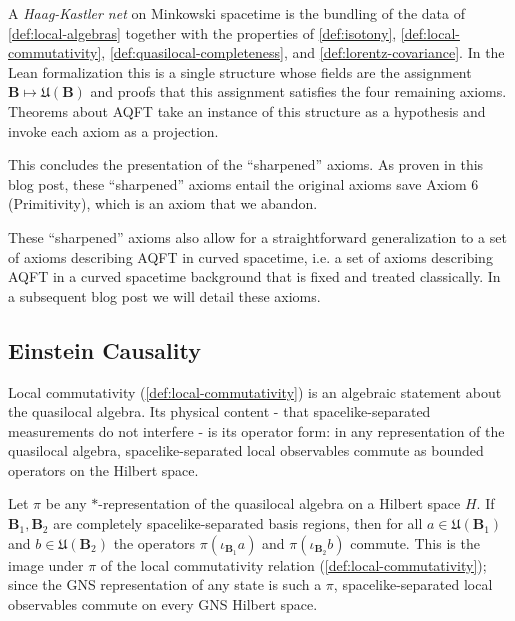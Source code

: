 \begin{definition}
    \label{def:haag-kastler-net}
    \leanok
    A \emph{Haag-Kastler net} on Minkowski spacetime is the bundling of the data of \ref{def:local-algebras} together with the properties of \ref{def:isotony}, \ref{def:local-commutativity}, \ref{def:quasilocal-completeness}, and \ref{def:lorentz-covariance}. In the Lean formalization this is a single structure whose fields are the assignment $\mathbf{B} \mapsto \mathfrak{U}(\mathbf{B})$ and proofs that this assignment satisfies the four remaining axioms. Theorems about AQFT take an instance of this structure as a hypothesis and invoke each axiom as a projection.
\end{definition}

This concludes the presentation of the ``sharpened'' axioms. As proven in this blog post, these ``sharpened'' axioms entail the original axioms save Axiom 6 (Primitivity), which is an axiom that we abandon.

These ``sharpened'' axioms also allow for a straightforward generalization to a set of axioms describing AQFT in curved spacetime, i.e. a set of axioms describing AQFT in a curved spacetime background that is fixed and treated classically. In a subsequent blog post we will detail these axioms.

\subsection{Einstein Causality}

Local commutativity (\ref{def:local-commutativity}) is an algebraic statement about the quasilocal algebra. Its physical content - that spacelike-separated measurements do not interfere - is its operator form: in any representation of the quasilocal algebra, spacelike-separated local observables commute as bounded operators on the Hilbert space.

\begin{theorem}
    \label{thrm:einstein-causality}
    \leanok
    Let $\pi$ be any $*$-representation of the quasilocal algebra on a Hilbert space $H$. If $\mathbf{B}_1, \mathbf{B}_2$ are completely spacelike-separated basis regions, then for all $a \in \mathfrak{U}(\mathbf{B}_1)$ and $b \in \mathfrak{U}(\mathbf{B}_2)$ the operators $\pi(\iota_{\mathbf{B}_1} a)$ and $\pi(\iota_{\mathbf{B}_2} b)$ commute. This is the image under $\pi$ of the local commutativity relation (\ref{def:local-commutativity}); since the GNS representation of any state is such a $\pi$, spacelike-separated local observables commute on every GNS Hilbert space.
\end{theorem}

